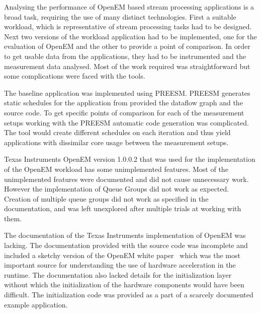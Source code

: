 Analysing the performance of OpenEM based stream processing applications is a broad task, requiring the use of many distinct technologies. First a suitable workload, which is representative of stream processing tasks had to be designed. Next two versions of the workload application had to be implemented, one for the evaluation of OpenEM and the other to provide a point of comparison. In order to get usable data from the applications, they had to be instrumented and the measurement data analysed. Most of the work required was straightforward but some complications were faced with the tools.

The baseline application was implemented using PREESM. PREESM generates static schedules for the application from provided the dataflow graph and the source code. To get specific points of comparison for each of the measurement setups working with the PREESM automatic code generation was complicated. The tool would create different schedules on each iteration and thus yield applications with dissimilar core usage between the measurement setups.

Texas Instruments OpenEM version 1.0.0.2 that was used for the implementation of the OpenEM workload has some unimplemented features. Most of the unimplemented features were documented and did not cause unnecessary work. However the implementation of Queue Groups did not work as expected. Creation of multiple queue groups did not work as specified in the documentation, and was left unexplored after multiple trials at working with them.

The documentation of the Texas Instruments implementation of OpenEM was lacking. The documentation provided with the source code was incomplete and included a sketchy version of the OpenEM white paper~\cite{moerman2014open} which was the most important source for understanding the use of hardware acceleration in the runtime. The documentation also lacked details for the initialization layer without which the initialization of the hardware components would have been difficult. The initialization code was provided as a part of a scarcely documented example application.

